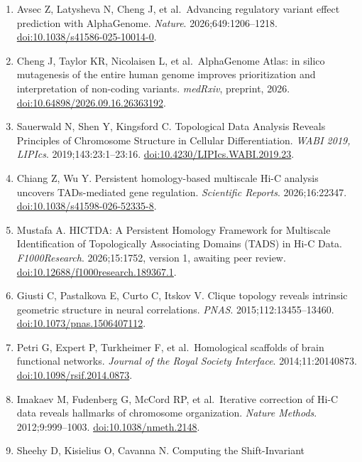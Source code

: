 \documentclass[
  11pt,
]{article}
\providecommand{\tightlist}{%
  \setlength{\itemsep}{0pt}\setlength{\parskip}{0pt}}
\begin{document}
\begin{enumerate}
\def\labelenumi{\arabic{enumi}.}
\tightlist
\item
  Avsec Z, Latysheva N, Cheng J, et al.~Advancing regulatory variant
  effect prediction with AlphaGenome. \emph{Nature}.
  2026;649:1206--1218.
  \href{https://doi.org/10.1038/s41586-025-10014-0}{doi:10.1038/s41586-025-10014-0}.
\item
  Cheng J, Taylor KR, Nicolaisen L, et al.~AlphaGenome Atlas: in silico
  mutagenesis of the entire human genome improves prioritization and
  interpretation of non-coding variants. \emph{medRxiv}, preprint, 2026.
  \href{https://doi.org/10.64898/2026.09.16.26363192}{doi:10.64898/2026.09.16.26363192}.
\item
  Sauerwald N, Shen Y, Kingsford C. Topological Data Analysis Reveals
  Principles of Chromosome Structure in Cellular Differentiation.
  \emph{WABI 2019, LIPIcs}. 2019;143:23:1--23:16.
  \href{https://doi.org/10.4230/LIPIcs.WABI.2019.23}{doi:10.4230/LIPIcs.WABI.2019.23}.
\item
  Chiang Z, Wu Y. Persistent homology-based multiscale Hi-C analysis
  uncovers TADs-mediated gene regulation. \emph{Scientific Reports}.
  2026;16:22347.
  \href{https://doi.org/10.1038/s41598-026-52335-8}{doi:10.1038/s41598-026-52335-8}.
\item
  Mustafa A. HICTDA: A Persistent Homology Framework for Multiscale
  Identification of Topologically Associating Domains (TADS) in Hi-C
  Data. \emph{F1000Research}. 2026;15:1752, version 1, awaiting peer
  review.
  \href{https://doi.org/10.12688/f1000research.189367.1}{doi:10.12688/f1000research.189367.1}.
\item
  Giusti C, Pastalkova E, Curto C, Itskov V. Clique topology reveals
  intrinsic geometric structure in neural correlations. \emph{PNAS}.
  2015;112:13455--13460.
  \href{https://doi.org/10.1073/pnas.1506407112}{doi:10.1073/pnas.1506407112}.
\item
  Petri G, Expert P, Turkheimer F, et al.~Homological scaffolds of brain
  functional networks. \emph{Journal of the Royal Society Interface}.
  2014;11:20140873.
  \href{https://doi.org/10.1098/rsif.2014.0873}{doi:10.1098/rsif.2014.0873}.
\item
  Imakaev M, Fudenberg G, McCord RP, et al.~Iterative correction of Hi-C
  data reveals hallmarks of chromosome organization. \emph{Nature
  Methods}. 2012;9:999--1003.
  \href{https://doi.org/10.1038/nmeth.2148}{doi:10.1038/nmeth.2148}.
\item
  Sheehy D, Kisielius O, Cavanna N. Computing the Shift-Invariant

\end{enumerate}
\end{document}
